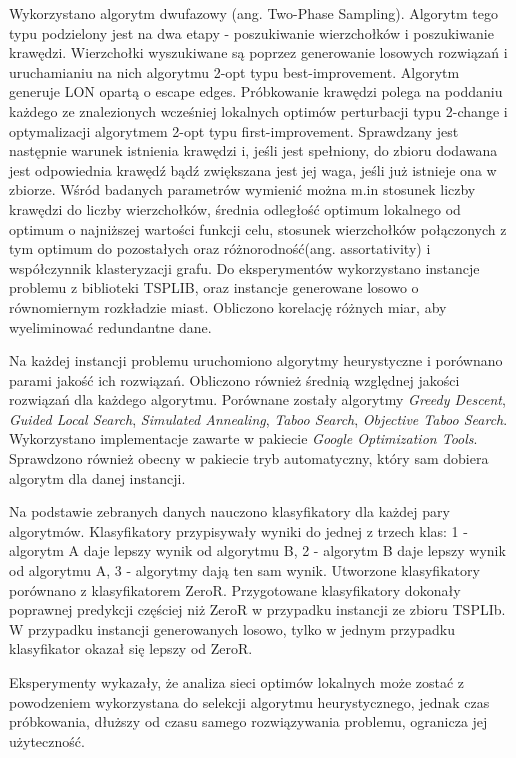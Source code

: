 Wykorzystano algorytm dwufazowy (ang. Two-Phase Sampling).
Algorytm tego typu podzielony jest na dwa etapy - poszukiwanie wierzchołków i poszukiwanie krawędzi.
Wierzchołki wyszukiwane są poprzez generowanie losowych rozwiązań i uruchamianiu na nich algorytmu 2-opt typu best-improvement.
Algorytm generuje LON opartą o escape edges.
Próbkowanie krawędzi polega na poddaniu każdego ze znalezionych wcześniej lokalnych optimów perturbacji typu 2-change i
optymalizacji algorytmem 2-opt typu first-improvement.
Sprawdzany jest następnie warunek istnienia krawędzi i, jeśli jest spełniony, do zbioru dodawana jest odpowiednia krawędź
bądź zwiększana jest jej waga, jeśli już istnieje ona w zbiorze.
Wśród badanych parametrów wymienić można m.in stosunek liczby krawędzi do liczby wierzchołków,
średnia odległość optimum lokalnego od optimum o najniższej wartości funkcji celu,
stosunek wierzchołków połączonych z tym optimum do pozostałych oraz różnorodność(ang. assortativity) i współczynnik klasteryzacji grafu.
Do eksperymentów wykorzystano instancje problemu z biblioteki TSPLIB, oraz instancje generowane losowo o równomiernym rozkładzie miast.
Obliczono korelację różnych miar, aby wyeliminować redundantne dane.

Na każdej instancji problemu uruchomiono algorytmy heurystyczne i porównano parami jakość ich rozwiązań.
Obliczono również średnią względnej jakości rozwiązań dla każdego algorytmu.
Porównane zostały algorytmy \textit{Greedy Descent}, \textit{Guided Local Search}, \textit{Simulated Annealing}, \textit{Taboo Search}, \textit{Objective Taboo Search}.
Wykorzystano implementacje zawarte w pakiecie \textit{Google Optimization Tools}. Sprawdzono również obecny w pakiecie tryb automatyczny, który sam dobiera
algorytm dla danej instancji.

Na podstawie zebranych danych nauczono klasyfikatory dla każdej pary algorytmów.
Klasyfikatory przypisywały wyniki do jednej z trzech klas: 1 - algorytm A daje lepszy wynik od algorytmu B,
2 - algorytm B daje lepszy wynik od algorytmu A, 3 - algorytmy dają ten sam wynik.
Utworzone klasyfikatory porównano z klasyfikatorem ZeroR.
Przygotowane klasyfikatory dokonały poprawnej predykcji częściej niż ZeroR w przypadku instancji ze
zbioru TSPLIb. W przypadku instancji generowanych losowo, tylko w jednym przypadku klasyfikator
okazał się lepszy od ZeroR.

Eksperymenty wykazały, że analiza sieci optimów lokalnych może zostać z powodzeniem wykorzystana do
selekcji algorytmu heurystycznego, jednak czas próbkowania, dłuższy od czasu samego rozwiązywania problemu,
ogranicza jej użyteczność.

